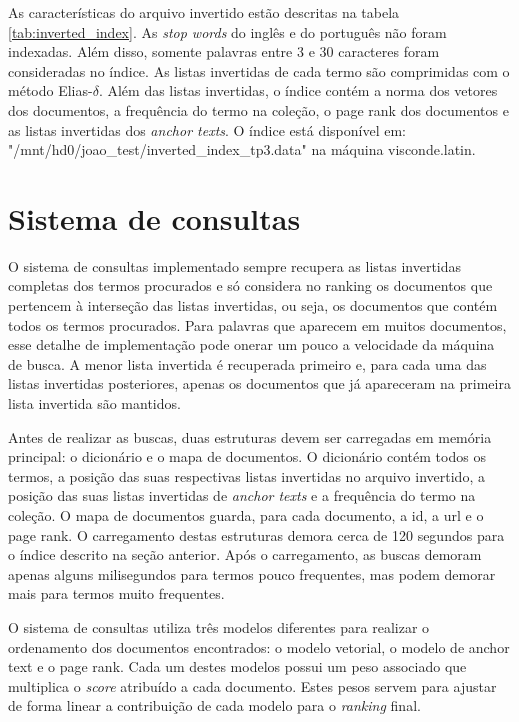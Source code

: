 \documentclass{article}
\begin{document}
As características do arquivo invertido estão descritas na 
tabela \ref{tab:inverted_index}. As \textit{stop words} do inglês e do 
português não foram indexadas. Além disso, somente palavras entre 3 e 30 caracteres
foram consideradas no índice. As listas invertidas de cada termo são comprimidas com
o método Elias-$ \delta $. Além das listas invertidas, o índice contém a norma dos vetores
dos documentos, a frequência do termo na coleção, o page rank dos documentos
e as listas invertidas dos \textit{anchor texts}. O índice está disponível em:
"/mnt/hd0/joao\_test/inverted\_index\_tp3.data" na máquina visconde.latin.

\section{Sistema de consultas}

O sistema de consultas implementado sempre recupera as listas invertidas completas dos termos
procurados e só considera no ranking os documentos que pertencem à interseção das listas invertidas, 
ou seja, os documentos que contém todos os termos procurados. Para palavras que aparecem em muitos documentos, esse
detalhe de implementação pode onerar um pouco a velocidade da máquina de busca. A menor lista 
invertida é recuperada primeiro e, para cada uma das listas invertidas posteriores, apenas os
documentos que já apareceram na primeira lista invertida são mantidos. 

Antes de realizar as buscas, duas estruturas devem ser carregadas em memória principal: 
o dicionário e o mapa de documentos. O dicionário contém todos os termos, a posição das
suas respectivas listas invertidas no arquivo invertido, a posição das suas listas invertidas
de \textit{anchor texts} e a frequência do termo na coleção. O mapa de documentos guarda, 
para cada documento, a id, a url e o page rank. O carregamento destas estruturas 
demora cerca de 120 segundos para o índice descrito na seção anterior. Após o carregamento, as buscas
demoram apenas alguns milisegundos para termos pouco frequentes, mas podem demorar mais para termos
muito frequentes.

O sistema de consultas utiliza três modelos diferentes para realizar o ordenamento dos documentos
encontrados: o modelo vetorial, o modelo de anchor text e o page rank. Cada um destes modelos
possui um peso associado que multiplica o \textit{score} atribuído a cada documento. Estes pesos
servem para ajustar de forma linear a contribuição de cada modelo para o \textit{ranking} final.
\end{document}
